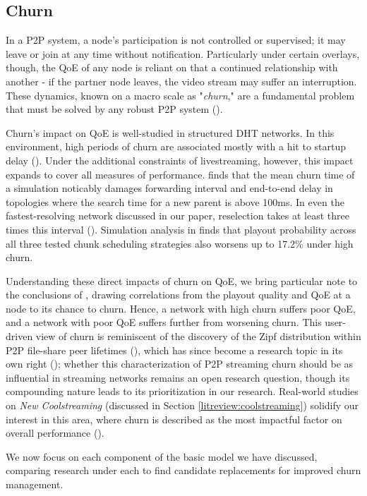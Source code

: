 \documentclass[12pt,a4paper]{article}
\begin{document}
\subsection{Churn} \label{litreview:churn}
In a P2P system, a node's participation is not controlled or supervised; it may leave or join at any time without notification. Particularly under certain overlays, though, the QoE of any node is reliant on that a continued relationship with another - if the partner node leaves, the video stream may suffer an interruption. These dynamics, known on a macro scale as "\textit{churn}," are a fundamental problem that must be solved by any robust P2P system (\cite{Stutzbach2004}).

Churn's impact on QoE is well-studied in structured DHT networks. In this environment, high periods of churn are associated mostly with a hit to startup delay (\cite{Ho2013}). Under the additional constraints of livestreaming, however, this impact expands to cover all measures of performance. \cite{Nanao2012} finds that the mean churn time of a simulation noticably damages forwarding interval and end-to-end delay in topologies where the search time for a new parent is above 100ms. In even the fastest-resolving network discussed in our paper, reselection takes at least three times this interval (\cite{Sina2020}). Simulation analysis in \cite{Kang2012} finds that playout probability across all three tested chunk scheduling strategies also worsens up to 17.2\% under high churn.

Understanding these direct impacts of churn on QoE, we bring particular note to the conclusions of \cite{Vassilakis2010}, drawing correlations from the playout quality and QoE at a node to its chance to churn. Hence, a network with high churn suffers poor QoE, and a network with poor QoE suffers further from worsening churn. This user-driven view of churn is reminiscent of the discovery of the Zipf distribution within P2P file-share peer lifetimes (\cite{Pouwelse2005}), which has since become a research topic in its own right  (\cite{Bustamante}); whether this characterization of P2P streaming churn should be as influential in streaming networks remains an open research question, though its compounding nature leads to its prioritization in our research. Real-world studies on \textit{New Coolstreaming} (discussed in Section \ref{litreview:coolstreaming}) solidify our interest in this area, where churn is described as the most impactful factor on overall performance (\cite{Li2007}).

We now focus on each component of the basic model we have discussed, comparing research under each to find candidate replacements for improved churn management.
\end{document}
